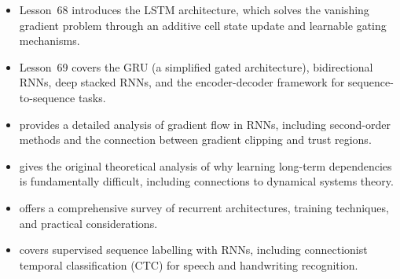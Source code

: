 \documentclass[11pt,a4paper]{article}
\begin{document}
\begin{itemize}
  \item Lesson~68 introduces the LSTM architecture, which solves the
    vanishing gradient problem through an additive cell state update
    and learnable gating mechanisms.
  \item Lesson~69 covers the GRU (a simplified gated architecture),
    bidirectional RNNs, deep stacked RNNs, and the encoder-decoder
    framework for sequence-to-sequence tasks.
  \item \citet{pascanu2013} provides a detailed analysis of gradient
    flow in RNNs, including second-order methods and the connection
    between gradient clipping and trust regions.
  \item \citet{bengio1994} gives the original theoretical analysis
    of why learning long-term dependencies is fundamentally difficult,
    including connections to dynamical systems theory.
  \item \citet[Chapter~10]{goodfellow2016} offers a comprehensive
    survey of recurrent architectures, training techniques, and
    practical considerations.
  \item \citet{graves2012} covers supervised sequence labelling with
    RNNs, including connectionist temporal classification (CTC) for
    speech and handwriting recognition.
\end{itemize}


\end{document}
